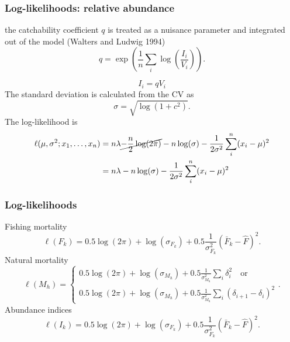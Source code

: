 \documentclass{beamer}
\begin{document}

\begin{frame}
\frametitle{Log-likelihoods: relative abundance}
the catchability coefficient $q$ is treated as a nuisance parameter and
integrated out of the model (Walters and Ludwig 1994)
\begin{equation*}
  q = \exp \left( \frac{1}{n} \sum_i \log \left( \frac{I_i}{V_i} \right) \right).
\end{equation*}

\begin{equation*}
  I_i = q V_i
\end{equation*}
The standard deviation is calculated from the CV as
\begin{equation*}
  \sigma = \sqrt{\log \left( 1+c^2 \right)}.
\end{equation*}
The log-likelihood is
\begin{align*}
  \ell(\mu,\sigma^2; x_1,\ldots,x_n)
  &= n \lambda \cancel{-\frac{n}{2} \log (2 \pi)} - n \log (\sigma) - \frac{1}{2\sigma^2} \sum_i^n (x_i - \mu)^2\\
  &= n \lambda - n \log (\sigma) - \frac{1}{2\sigma^2} \sum_i^n (x_i - \mu)^2\\
\end{align*}
\end{frame}


\begin{frame}
\frametitle{Log-likelihoods}
Fishing mortality
\begin{equation*}
  \ell(F_k) = 0.5 \log (2 \pi) + \log (\sigma_{F_k}) + 0.5
  \frac{1}{\sigma^2_{F_k}} (\bar{F}_k - \hat{F})^2.
\end{equation*}
Natural mortality
\begin{equation*}
  \ell(M_h) = 
  \begin{cases}
    0.5 \log (2 \pi) + \log (\sigma_{M_h}) + 0.5 \frac{1}{\sigma^2_{M_h}} \sum_i
    \delta_i^2 \quad \text{or}\\
    0.5 \log (2 \pi) + \log (\sigma_{M_h}) + 0.5 \frac{1}{\sigma^2_{M_h}} \sum_i
    (\delta_{i+1} - \delta_i)^2
  \end{cases}.
\end{equation*}
Abundance indices
\begin{equation*}
  \ell(I_k) = 0.5 \log (2 \pi) + \log (\sigma_{F_k}) + 0.5
  \frac{1}{\sigma^2_{F_k}} (\bar{F}_k - \hat{F})^2.
\end{equation*}

\end{frame}
\end{document}

